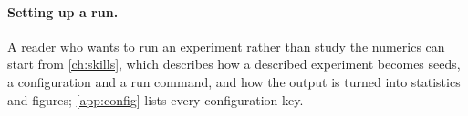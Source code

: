 \paragraph{Setting up a run.} A reader who wants to run an experiment rather than study the numerics can start
from \cref{ch:skills}, which describes how a described experiment becomes seeds, a configuration and a run
command, and how the output is turned into statistics and figures; \cref{app:config} lists every configuration
key.
